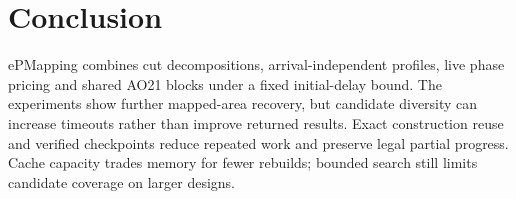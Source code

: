 \section{Conclusion}
ePMapping combines cut decompositions, arrival-independent profiles, live phase pricing and shared AO21 blocks under a fixed initial-delay bound. The experiments show further mapped-area recovery, but candidate diversity can increase timeouts rather than improve returned results. Exact construction reuse and verified checkpoints reduce repeated work and preserve legal partial progress. Cache capacity trades memory for fewer rebuilds; bounded search still limits candidate coverage on larger designs.
